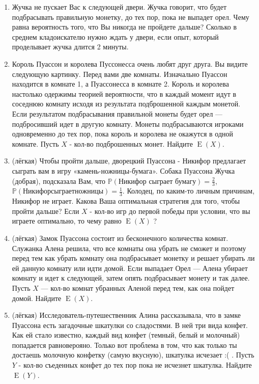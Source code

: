 \documentclass[a4paper,12pt]{article}
\DeclareMathOperator{\E}{E}
\def \P{\mathbb{P}}
\begin{document}
\begin{enumerate} %
\item Жучка не пускает Вас к следующей двери. Жучка говорит, что будет подбрасывать правильную монетку, до тех пор, пока не выпадет орел. Чему равна вероятность того, что Вы никогда не пройдете дальше? Сколько в среднем кладоискателю нужно ждать у двери, если опыт, который проделывает жучка длится 2 минуты.
\item Король Пуассон и королева Пуссонесса очень любят друг друга. Вы видите следующую картинку. Перед вами две комнаты. Изначально Пуассон находится в комнате 1, а Пуассонесса в комнате 2. Король и королева настолько одержимы теорией вероятности, что в каждый момент идут в соседнюю комнату исходя из результата подброшенной каждым монетой. Если результатом подбрасывания правильной монеты будет орел — подбросивший идет в другую комнату. Монеты подбрасываются игроками одновременно до тех пор, пока король и королева не окажутся в одной комнате.
Пусть $X$ - кол-во подброшенных монет. Найдите $\E(X)$.
\item (лёгкая) Чтобы пройти дальше, дворецкий Пуассона - Никифор предлагает сыграть вам в игру «камень-ножницы-бумага». Собака Пуассона Жучка (добрая), подсказала Вам, что $\P(\text{Никифор сыграет бумагу}) = \frac{2}{3}$, $\P({Никифор сыграет ножницы}) = \frac{1}{3}$. Колодец, по каким-то личным причинам, Никифор не играет. Какова Ваша оптимальная стратегия для того, чтобы пройти дальше? Если $X$ - кол-во игр до первой победы при условии, что вы играете оптимально, то чему равно $\E(X)$ ?
\item (лёгкая) Замок Пуассона состоит из бесконечного количества комнат. Служанка Алена решила, что все комнаты она убрать не сможет и поэтому перед тем как убрать комнату она подбрасывает монетку и решает убирать ли ей данную комнату или идти домой. Если выпадает Орел — Алена убирает комнату и идет к следующей, затем опять подбрасывает монету и так далее. Пусть $X$ — кол-во комнат убранных Аленой перед тем, как она пойдет домой. Найдите $\E(X)$.
\item (лёгкая) Исследователь-путешественник Алина рассказывала, что в замке Пуассона есть загадочные шкатулки со сладостями. В ней три вида конфет. Как ей стало известно, каждый вид конфет (темный, белый и молочный) попадается равноверояно. Только вот проблема в том, что как только ты достаешь молочную конфетку (самую вкусную), шкатулка исчезает :( .
Пусть $Y$ - кол-во съеденных конфет до тех пор пока не исчезнет шкатулка. Найдите $\E(Y)$.
\end{enumerate}
\end{document}
